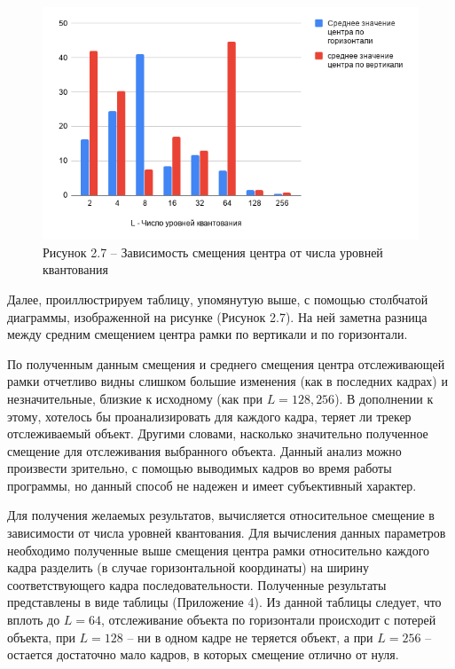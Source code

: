 \begin{figure}[h!]
    \centering
    \includegraphics[width = 14 cm]{tests/img/sm.png}
    \caption*{Рисунок 2.7 -- Зависимость смещения центра от числа уровней квантования}
\end{figure}

Далее, проиллюстрируем таблицу, упомянутую выше, с помощью столбчатой диаграммы, изображенной на рисунке (Рисунок 2.7). На ней заметна разница между средним смещением центра рамки по вертикали и по горизонтали. 

По полученным данным смещения и среднего смещения центра отслеживающей рамки отчетливо видны слишком большие изменения (как в последних кадрах) и незначительные, близкие к исходному (как при $L=128,256$). В дополнении к этому, хотелось бы проанализировать для каждого кадра, теряет ли трекер отслеживаемый объект. Другими словами, насколько значительно 
полученное смещение для отслеживания выбранного объекта. Данный анализ можно произвести зрительно, с помощью выводимых кадров во время работы программы, но данный способ не надежен и имеет субъективный характер.

Для получения желаемых результатов, вычисляется относительное смещение в зависимости от числа уровней квантования. Для вычисления данных параметров необходимо полученные выше смещения центра рамки относительно каждого кадра разделить (в случае горизонтальной координаты) на ширину соответствующего кадра последовательности. Полученные результаты представлены в виде таблицы (Приложение 4). Из данной таблицы следует, что вплоть до $L=64$, отслеживание объекта по горизонтали происходит с потерей объекта, при $L=128$ -- ни в одном кадре не теряется объект, а при $L=256$ -- остается достаточно мало кадров, в которых смещение отлично от нуля. 

